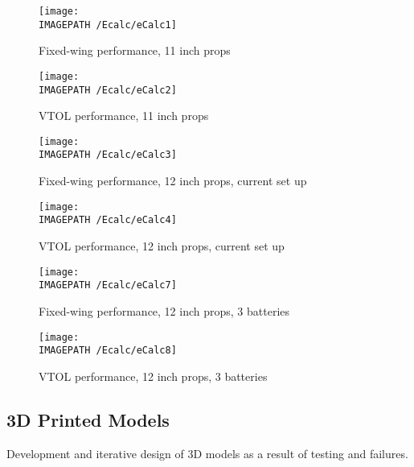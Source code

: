 \begin{figure}[H]
	\centering
	\texttt{[image: \\IMAGEPATH /Ecalc/eCalc1]}
	\caption{Fixed-wing performance, 11 inch props}
\end{figure}
\begin{figure}[H]
	\centering
	\texttt{[image: \\IMAGEPATH /Ecalc/eCalc2]}
	\caption{VTOL performance, 11 inch props}
\end{figure}
\begin{figure}[H]
	\centering
	\texttt{[image: \\IMAGEPATH /Ecalc/eCalc3]}
	\caption{Fixed-wing performance, 12 inch props, current set up}
	\label{fig:fixed}
\end{figure}
\begin{figure}[H]
	\centering
	\texttt{[image: \\IMAGEPATH /Ecalc/eCalc4]}
	\caption{VTOL performance, 12 inch props, current set up}
	\label{fig:vtol}
\end{figure}
\begin{figure}[H]
	\centering
	\texttt{[image: \\IMAGEPATH /Ecalc/eCalc7]}
	\caption{Fixed-wing performance, 12 inch props, 3 batteries}
\end{figure}
\begin{figure}[H]
	\centering
	\texttt{[image: \\IMAGEPATH /Ecalc/eCalc8]}
	\caption{VTOL performance, 12 inch props, 3 batteries}
\end{figure}

\newpage

\subsection{3D Printed Models}
\label{sec:print}
Development and iterative design of 3D models as a result of testing and failures.\\

